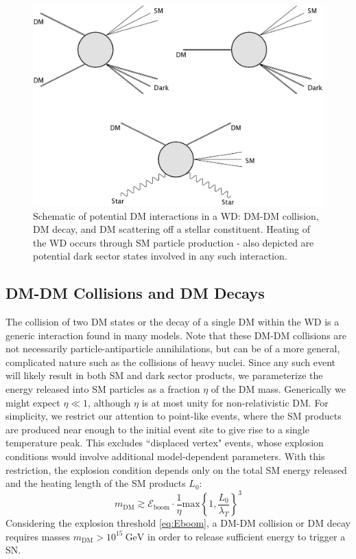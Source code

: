\documentclass[twocolumn,showpacs,preprintnumbers,amsmath,amssymb,prd]{revtex4}
\newcommand{\GeV}{\text{GeV}}
\begin{document}
\begin{figure}
\includegraphics[scale=0.09]{feynmandiag.jpg}
\caption{Schematic of potential DM interactions in a WD: DM-DM collision, DM decay, and DM scattering off a stellar constituent.
Heating of the WD occurs through SM particle production - also depicted are potential dark sector states involved in any such interaction.}
\label{fig:feynman}
\end{figure}

\subsection{DM-DM Collisions and DM Decays}
\label{sec:coldecay}
The collision of two DM states or the decay of a single DM within the WD is a generic interaction found in many models.
Note that these DM-DM collisions are not necessarily particle-antiparticle annihilations, but can be of a more general, complicated nature such as the collisions of heavy nuclei.
Since any such event will likely result in both SM and dark sector products, we parameterize the energy released into SM particles as a fraction $\eta$ of the DM mass.
Generically we might expect $\eta \ll 1$, although $\eta$ is at most unity for non-relativistic DM.
For simplicity, we restrict our attention to point-like events, where the SM products are produced near enough to the initial event site to give rise to a single temperature peak.
 This excludes ``displaced vertex" events, whose explosion conditions would involve additional model-dependent parameters.
With this restriction, the explosion condition depends only on the total SM energy released and the heating length of the SM products $L_0$:
\begin{equation}
\label{eq:coldecay}
    m_\text{DM} \gtrsim \mathcal{E}_\text{boom} \cdot \frac{1}{\eta}
      \text{max}\left\{1, \frac{L_0}{\lambda_T}\right\}^3
\end{equation}
Considering the explosion threshold \eqref{eq:Eboom}, a DM-DM collision or DM decay requires masses $m_\text{DM} > 10^{15} ~\GeV$ in order to release sufficient energy to trigger a SN.
\end{document}
